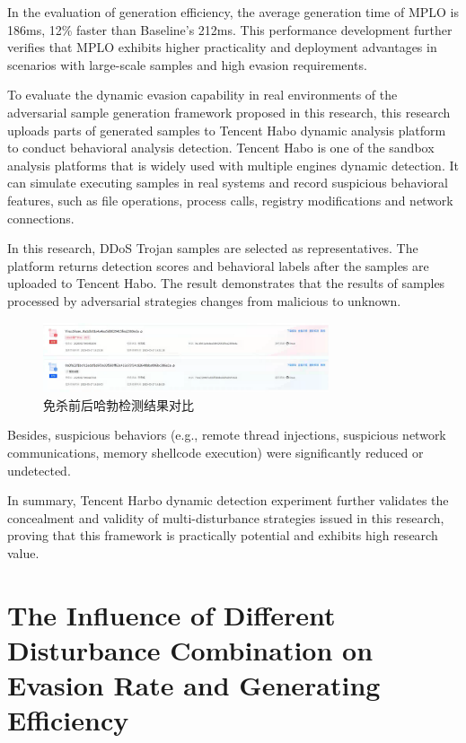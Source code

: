 In the evaluation of generation efficiency, the average generation time of MPLO is 186ms, 12\% faster than Baseline's 212ms. This performance development further verifies that MPLO exhibits higher practicality and deployment advantages in scenarios with large-scale samples and high evasion requirements.

To evaluate the dynamic evasion capability in real environments of the adversarial sample generation framework proposed in this research, this research uploads parts of generated samples to Tencent Habo dynamic analysis platform to conduct behavioral analysis detection. Tencent Habo is one of the sandbox analysis platforms that is widely used with multiple engines dynamic detection. It can simulate executing samples in real systems and record suspicious behavioral features, such as file operations, process calls, registry modifications and network connections.

In this research, DDoS Trojan samples are selected as representatives. The platform returns detection scores and behavioral labels after the samples are uploaded to Tencent Habo. The result demonstrates that the results of samples processed by adversarial strategies changes from malicious to unknown.

\begin{figure}[hbt]
	\centering
	\includegraphics[width=0.75\textwidth]{figures/5.2}
	\caption{免杀前后哈勃检测结果对比}\label{fig:5.2}
\end{figure}

Besides, suspicious behaviors (e.g., remote thread injections, suspicious network communications, memory shellcode execution) were significantly reduced or undetected.

In summary, Tencent Harbo dynamic detection experiment further validates the concealment and validity of multi-disturbance strategies issued in this research, proving that this framework is practically potential and exhibits high research value. 

\section{The Influence of Different Disturbance Combination on Evasion Rate and Generating Efficiency}

